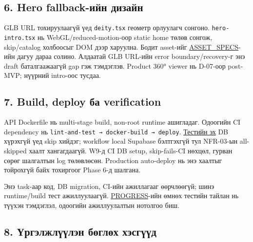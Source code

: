\documentclass[
  11pt,
  a4paper,
]{article}
\begin{document}
\subsection{6. Hero fallback-ийн
дизайн}\label{doc6-hero-fallback-ux438ux439ux43d-ux434ux438ux437ux430ux439ux43d}

GLB URL тохируулаагүй үед \nolinkurl{deity.tsx} геометр орлуулагч
сонгоно. \nolinkurl{hero-intro.tsx} нь WebGL/reduced-motion-оор static
home төлөв сонгож, skip/catalog холбоосыг DOM дээр харуулна. Бодит
asset-ийг \href{../../../agent-context/ASSET_SPECS.md}{ASSET\_SPECS}-ийн
дагуу дараа солино. Алдаатай GLB URL-ийн error boundary/recovery-г энэ
draft баталгаажаагүй gap гэж тэмдэглэв. Product 360° viewer нь D-07-оор
post-MVP; нүүрний intro-оос тусдаа.

\subsection{7. Build, deploy ба
verification}\label{doc6-build-deploy-ux431ux430-verification}

API Dockerfile нь multi-stage build, non-root runtime ашигладаг.
Одоогийн CI dependency нь
\nolinkurl{lint-and-test → docker-build → deploy}.
\href{../../../backend/api/tests/inquiry-cart.integration.test.ts}{Тестийн
эх} DB хүрэхгүй үед skip хийдэг; workflow local Supabase бэлтгэхгүй тул
NFR-03-ын all-skipped хаалт хангагдаагүй. W9-д CI DB setup,
skip-fails-CI нөхцөл, гурван сөрөг шалгалтын log төлөвлөсөн. Production
auto-deploy нь энэ хаалтыг тойрохгүй байх тохиргоог Phase 6-д шалгана.

Энэ task-аар код, DB migration, CI-ийн ажиллагааг өөрчлөөгүй; шинэ
runtime/build тест ажиллуулаагүй.
\href{../../../agent-context/PROGRESS.md}{PROGRESS}-ийн өмнөх тестийн
тайлан нь түүхэн тэмдэглэл, одоогийн ажиллуулалтын нотолгоо биш.

\subsection{8. Үргэлжлүүлэн бөглөх
хэсгүүд}\label{doc6-ux4afux440ux433ux44dux43bux436ux43bux4afux4afux43bux44dux43d-ux431ux4e9ux433ux43bux4e9ux445-ux445ux44dux441ux433ux4afux4afux434}
\end{document}

